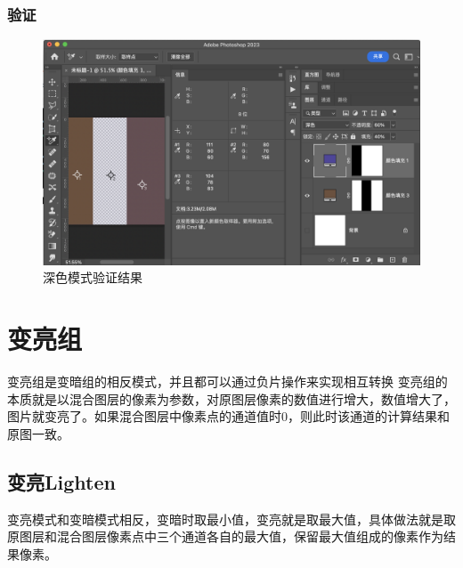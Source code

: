 \subsection{ 验证}

\begin{figure}[!htb]
	\centering
	\includegraphics[width=\linewidth]{figure/darker}
	\caption{深色模式验证结果}
	\label{fig:darker}
\end{figure}


%
%

\chapter{变亮组}
\begin{introduction}
	\item  变亮组是变暗组的相反模式，并且都可以通过负片操作来实现相互转换
	变亮组的本质就是以混合图层的像素为参数，对原图层像素的数值进行增大，数值增大了，图片就变亮了。如果混合图层中像素点的通道值时0，则此时该通道的计算结果和原图一致。
\end{introduction}


\section{ 变亮Lighten}

变亮模式和变暗模式相反，变暗时取最小值，变亮就是取最大值，具体做法就是取原图层和混合图层像素点中三个通道各自的最大值，保留最大值组成的像素作为结果像素。

